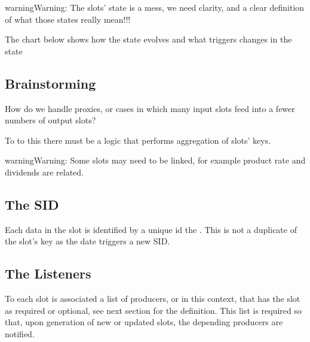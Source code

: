 \documentclass[letterpaper,10pt,english]{sphinxmanual}
\begin{document}
\begin{sphinxadmonition}{warning}{Warning:}
The slots’ state is a mess, we need clarity, and a clear definition
of what those states really mean!!!
\end{sphinxadmonition}

The chart below shows how the state evolves and what triggers changes in the
state



\subsection{Brainstorming}
\label{\detokenize{slot_prod:brainstorming}}
How do we handle proxies, or cases in which many input slots feed into
a fewer numbers of output slots?

To to this there must be a logic that performs aggregation of slots’ keys.

\begin{sphinxadmonition}{warning}{Warning:}
Some slots may need to be linked, for example product rate and
dividends are related.
\end{sphinxadmonition}


\subsection{The SID}
\label{\detokenize{slot_prod:the-sid}}
Each data in the slot is identified by a unique id the . This is not a
duplicate of the slot’s key as the date triggers a new SID.


\subsection{The Listeners}
\label{\detokenize{slot_prod:the-listeners}}
To each slot is associated a list of producers, or  in this context,
that has the slot as required or optional, see next section for the definition.
This list is required so that, upon generation of new or updated slots, the
depending producers are notified.
\end{document}
